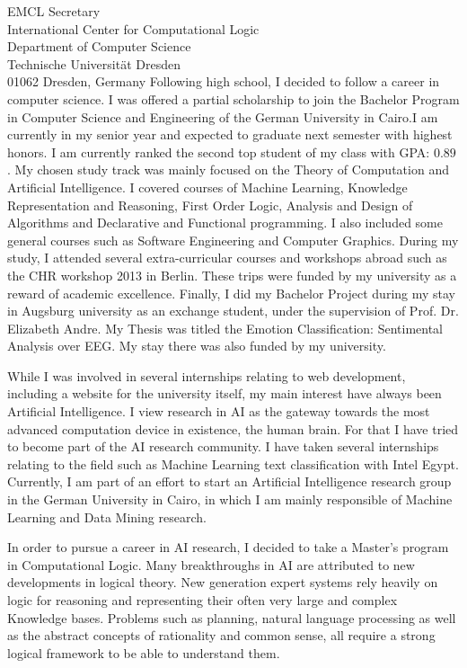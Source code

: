 \documentclass[11pt]{letter} %
\begin{document}
\begin{letter}{
EMCL Secretary \\
International Center for Computational Logic \\
Department of Computer Science\\
Technische Universität Dresden \\
01062 Dresden,
Germany}
  Following high school, I decided to follow a career in computer science. I was
  offered a partial scholarship to join the Bachelor Program in Computer Science
  and Engineering of the German University in Cairo.I am currently in my senior
  year and expected to graduate next semester with highest honors. I am
  currently ranked the second top student of my class with GPA: $0.89$ . My
  chosen study track was mainly focused on the Theory of Computation and
  Artificial Intelligence. I covered courses of Machine Learning, Knowledge
  Representation and Reasoning, First Order Logic, Analysis and Design of
  Algorithms and Declarative and Functional
  programming. I also included some general courses such as Software Engineering
  and Computer Graphics. During my study, I attended several extra-curricular courses and
  workshops abroad such as the CHR workshop 2013 in Berlin. These trips were
  funded by my university as a reward of academic excellence. Finally, I did my
  Bachelor Project during my stay in Augsburg university as an exchange student,
  under the supervision of Prof. Dr. Elizabeth Andre. My Thesis was titled the
  Emotion Classification: Sentimental Analysis over EEG. My stay there was also
  funded by my university.

  While I was involved in several internships relating to web development,
  including a website for the university itself, my main interest have always
  been Artificial Intelligence. I view research in AI as the gateway towards the
  most advanced computation device in existence, the human brain. For that I have
  tried to become part of the AI research community. I have taken several
  internships relating to the field such as Machine Learning text classification
  with Intel Egypt. Currently, I am part of an effort to start an Artificial
  Intelligence research group in the German University in Cairo, in which I am
  mainly responsible of Machine Learning and Data Mining research.
  
  In order to pursue a career in AI research, I decided to take a Master's program in
  Computational Logic. Many breakthroughs in AI are attributed to new
  developments in logical theory. New generation expert systems rely heavily on
  logic for reasoning and representing their often very large and complex
  Knowledge bases. Problems such as planning, natural language processing as
  well as the abstract concepts of rationality and common sense, all require
  a strong logical framework to be able to understand them.


\end{letter}
\end{document}
